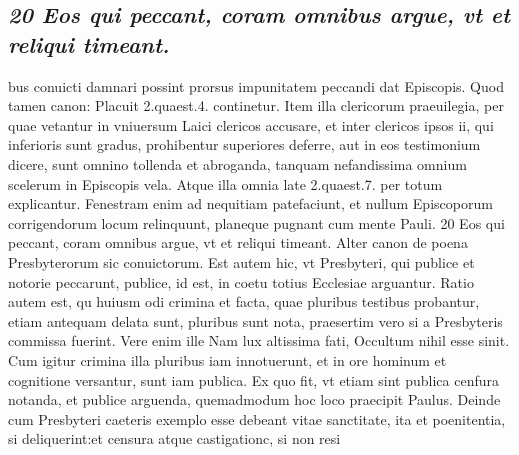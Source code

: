 \documentclass{article}
\begin{document}
\begin{pages}
\subsection*{\textit{20 Eos qui peccant, coram omnibus argue, vt et reliqui timeant.}}bus conuicti damnari possint prorsus impunitatem peccandi dat Episcopis. Quod tamen canon: Placuit 2.quaest.4. continetur. Item illa clericorum praeuilegia, per quae vetantur in vniuersum Laici clericos accusare, et inter clericos ipsos ii, qui inferioris sunt gradus, prohibentur superiores deferre, aut in eos testimonium dicere, sunt omnino tollenda et abroganda, tanquam nefandissima omnium scelerum in Episcopis vela. Atque illa omnia late 2.quaest.7. per totum explicantur. Fenestram enim ad nequitiam patefaciunt, et nullum Episcoporum corrigendorum locum relinquunt, planeque pugnant cum mente Pauli. 20 Eos qui peccant, coram omnibus argue, vt et reliqui timeant. Alter canon de poena Presbyterorum sic conuictorum. Est autem hic, vt Presbyteri, qui publice et notorie peccarunt, publice, id est, in coetu totius Ecclesiae arguantur. Ratio autem est, qu huiusm odi crimina et facta, quae pluribus testibus probantur, etiam antequam delata sunt, pluribus sunt nota, praesertim vero si a Presbyteris commissa fuerint. Vere enim ille Nam lux altissima fati, Occultum nihil esse sinit. Cum igitur crimina illa pluribus iam innotuerunt, et in ore hominum et cognitione versantur, sunt iam publica. Ex quo fit, vt etiam sint publica cenfura notanda, et publice arguenda, quemadmodum hoc loco praecipit Paulus. Deinde cum Presbyteri caeteris exemplo esse debeant vitae sanctitate, ita et poenitentia, si deliquerint:et censura atque castigationc, si non resi\pend

\end{pages}
\end{document}
